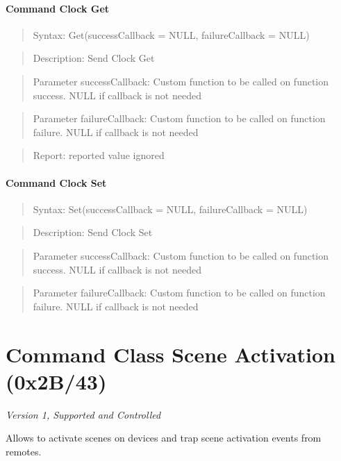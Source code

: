 \paragraph{Command Clock Get}
\begin{quote}Syntax: Get(successCallback = NULL, failureCallback = NULL)\end{quote}
\begin{quote}Description: Send Clock Get\end{quote}
\begin{quote}Parameter successCallback: Custom function to be called on function success. NULL if callback is not needed\end{quote}
\begin{quote}Parameter failureCallback: Custom function to be called on function failure. NULL if callback is not needed\end{quote}
\begin{quote}Report: reported value ignored\end{quote}

\paragraph{Command Clock Set}
\begin{quote}Syntax: Set(successCallback = NULL, failureCallback = NULL)\end{quote}
\begin{quote}Description: Send Clock Set\end{quote}
\begin{quote}Parameter successCallback: Custom function to be called on function success. NULL if callback is not needed\end{quote}
\begin{quote}Parameter failureCallback: Custom function to be called on function failure. NULL if callback is not needed\end{quote}



\section{Command Class Scene Activation (0x2B/43)}

\textit{Version 1, Supported and Controlled}
\newline

Allows to activate scenes on devices and trap scene activation events from remotes.
\newline

